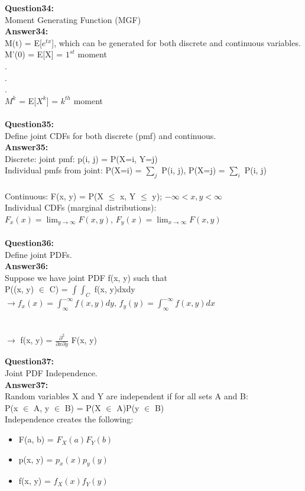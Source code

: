 \documentclass{article}
\begin{document}
\textbf{Question34:} \\
Moment Generating Function (MGF)
\\
\textbf{Answer34:}\\
M(t) = E[$e^{tx}$], which can be generated for both discrete and continuous variables.\\
M'(0) = E[X] = $1^{st}$ moment\\
.\\
.\\
.\\
$M^k$ = E[$X^k$] = $k^{th}$ moment
\\\\


\textbf{Question35:} \\
Define joint CDFs for both discrete (pmf) and continuous.
\\
\textbf{Answer35:}\\
Discrete: joint pmf: p(i, j) = P(X=i, Y=j)\\
Individual pmfs from joint: P(X=i) = $\sum_j$ P(i, j), P(X=j) = $\sum_i$ P(i, j)
\\\\
Continuous: F(x, y) = P(X $\leq$ x, Y $\leq$ y); $-\infty<x,y<\infty$\\
Individual CDFs (marginal distributions):\\
$F_x(x) = \lim_{y\to\infty} F(x,y)$, $F_y(x) = \lim_{x\to\infty} F(x,y)$
\\\\

\textbf{Question36:} \\
Define joint PDFs.
\\
\textbf{Answer36:}\\
Suppose we have joint PDF f(x, y) such that\\
P((x, y) $\in$ C) = $\int \int_{C}$ f(x, y)dxdy\\
$\rightarrow f_x(x) = \int_{\infty}^{-\infty} f(x, y)dy$, $f_y(y) = \int_{\infty}^{-\infty} f(x, y)dx$\\
\\\\
$\rightarrow$ f(x, y) = $\frac{\partial^2}{\partial x \partial y}$ F(x, y)


\textbf{Question37:} \\
Joint PDF Independence.
\\
\textbf{Answer37:}\\
Random variables X and Y are independent if for all sets A and B:\\
P(x $\in$ A, y $\in$ B) = P(X $\in$ A)P(y $\in$ B)\\
Independence creates the following:
\begin{itemize}
	\item F(a, b) = $F_X(a)F_Y(b)$
	\item p(x, y) = $p_x(x)p_y(y)$
	\item f(x, y) = $f_X(x)f_Y(y)$
\end{itemize}
\end{document}
